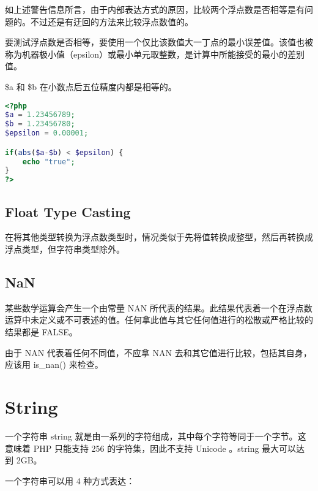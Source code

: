 如上述警告信息所言，由于内部表达方式的原因，比较两个浮点数是否相等是有问题的。不过还是有迂回的方法来比较浮点数值的。

要测试浮点数是否相等，要使用一个仅比该数值大一丁点的最小误差值。该值也被称为机器极小值（epsilon）或最小单元取整数，是计算中所能接受的最小的差别值。

\$a 和 \$b 在小数点后五位精度内都是相等的。

\begin{lstlisting}[language=PHP]
<?php
$a = 1.23456789;
$b = 1.23456780;
$epsilon = 0.00001;

if(abs($a-$b) < $epsilon) {
    echo "true";
}
?>
\end{lstlisting}

\subsection{Float Type Casting}


在将其他类型转换为浮点数类型时，情况类似于先将值转换成整型，然后再转换成浮点类型，但字符串类型除外。

\subsection{NaN}

某些数学运算会产生一个由常量 NAN 所代表的结果。此结果代表着一个在浮点数运算中未定义或不可表述的值。任何拿此值与其它任何值进行的松散或严格比较的结果都是 FALSE。

由于 NAN 代表着任何不同值，不应拿 NAN 去和其它值进行比较，包括其自身，应该用 is\_nan() 来检查。




\section{String}

一个字符串 string 就是由一系列的字符组成，其中每个字符等同于一个字节。这意味着 PHP 只能支持 256 的字符集，因此不支持 Unicode 。string 最大可以达到 2GB。



一个字符串可以用 4 种方式表达：

